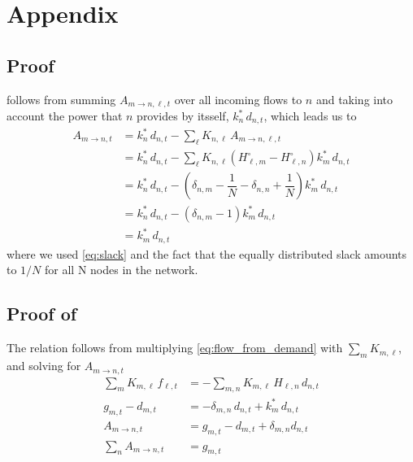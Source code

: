\documentclass[11pt,twocolumn]{article}
\newcommand{\nodalgeneration}[1][n]{g_{#1,t}}
\newcommand{\nodaldemand}[1][n]{d_{#1,t}}
\newcommand{\incidence}[1][n]{K_{#1,\ell}}
\newcommand{\ptdf}[1][n]{H_{\ell,#1}}
\newcommand{\ptdfEqual}[1][n]{\ptdf[#1]^\circ}
\newcommand{\slackk}[1][n]{k^*_{#1}}
\newcommand{\flow}{f_{\ell,t}}
\newcommand{\allocatePeer}[1][m \rightarrow n]{A_{#1,t}}
\newcommand{\allocateTransaction}[1][m \rightarrow n]{A_{#1,\ell,t}}
\begin{document}
% 

\clearpage
\appendix

\section{Appendix}

\subsection{\texorpdfstring{Proof }{First Proof}}
\label{sec:proof_allocate_peer}

 follows from summing $\allocateTransaction$ over all incoming flows to $n$ and taking into account the power that $n$ provides by itsself, $\slackk \, \nodaldemand$, which leads us to
\begin{align*}
\allocatePeer &= \slackk \, \nodaldemand - \sum_{\ell} \incidence \, \allocateTransaction \\
&= \slackk \, \nodaldemand - \sum_\ell \incidence \left(  \ptdfEqual[m] - \ptdfEqual \right) \slackk[m] \, \nodaldemand  \\
&= \slackk \, \nodaldemand - \left(  \delta_{n,m} - \dfrac{1}{N} - \delta_{n,n} + \dfrac{1}{N} \right) \slackk[m] \, \nodaldemand  \\
&= \slackk \, \nodaldemand - \left(  \delta_{n,m} - 1 \right) \slackk[m] \, \nodaldemand  \\
&= \slackk[m] \, \nodaldemand 
\end{align*}
where we used \cref{eq:slack} and the fact that the equally distributed slack amounts to $1/N$ for all N nodes in the network. 



\subsection{\texorpdfstring{Proof of }{Second proof}}
\label{sec:proof_sum_n_allocate_peer}
The relation follows from multiplying \cref{eq:flow_from_demand} with $\sum_m \incidence[m]$, and solving for $\allocatePeer$
\begin{align*}
\sum_m \incidence[m] \, \flow &= - \sum_{m,n} \incidence[m] \, \ptdf \, \nodaldemand \\
\nodalgeneration[m] - \nodaldemand[m] &= - \delta_{m,n} \, \nodaldemand + \slackk[m] \, \nodaldemand    \\
\allocatePeer &= \nodalgeneration[m] - \nodaldemand[m] + \delta_{m,n} \nodaldemand \\
\sum_n \allocatePeer &= \nodalgeneration[m]
\end{align*}
\end{document}
